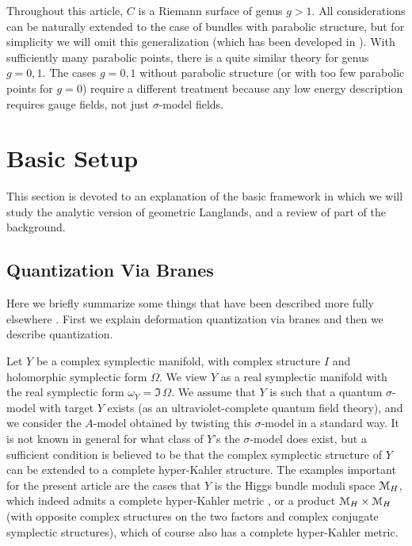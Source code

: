 \documentclass[11pt,a4paper]{article}
\begin{document}
Throughout this article, $C$ is a Riemann surface of genus $g>1$.    All considerations can be naturally extended to the case of bundles with parabolic
structure, but for simplicity we will omit this generalization (which has been developed in \cite{EFK,EFK2,EFK3}).  With sufficiently many parabolic
points, there is a quite similar theory for genus $g=0,1$.   The cases $g=0,1$ without parabolic structure (or with too few parabolic points for $g=0$)
require a different treatment because any low energy description requires gauge fields, not just $\sigma$-model fields.



\section{Basic Setup}\label{basic}

This section is devoted to an explanation of the basic framework in which we will study the analytic version of geometric Langlands,
and a review of part of the background.

\subsection{Quantization Via Branes}\label{background}

Here we briefly summarize some things that have been described more fully elsewhere \cite{GuW,GW}.   First we explain deformation quantization via
branes and then we describe quantization.

Let $Y$ be a complex symplectic manifold, with complex structure $I$ and
holomorphic symplectic form $\Omega$.   We view $Y$ as a real symplectic manifold with the real symplectic
form $\omega_Y=\Im\,\Omega$.   We assume that $Y$ is such that a quantum $\sigma$-model with target $Y$ exists (as an ultraviolet-complete
quantum field theory), and we consider the $A$-model obtained
by twisting this $\sigma$-model in a standard way.   It is not known in general for what class of $Y$'s the $\sigma$-model does exist, but a sufficient condition is believed
to be that the complex symplectic structure of $Y$ can be extended to a complete hyper-Kahler structure.   The examples important for the present article are
the cases that $Y$ is the Higgs bundle moduli space ${\mathcal M}_H$, which indeed admits a complete hyper-Kahler metric \cite{H}, or a product ${\mathcal M}_H\times {\mathcal M}_H$ (with
opposite complex structures on the two factors and complex conjugate symplectic structures), which of course also has a complete hyper-Kahler metric.
\end{document}
